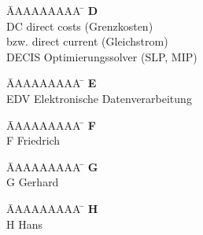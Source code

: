 \vspace*{-1.5cm}
\begin{tabbing}
	\hspace{0.0cm}  \= AAAAAAAAA \=       \hspace{2cm} \kill
	\> \textbf{D} 	\> \\
	\> DC			\> direct costs (Grenzkosten)\\
	\>      		\> bzw. direct current (Gleichstrom)\\
	\> DECIS\footnotemark \> Optimierungssolver (SLP, MIP)\\
\end{tabbing} 

\vspace*{-1.5cm}
\begin{tabbing}
	\hspace{0.0cm}  \= AAAAAAAAA \=       \hspace{2cm} \kill
	\> \textbf{E} 	\> \\
	\> EDV 			\> Elektronische Datenverarbeitung\\
\end{tabbing} 

\vspace*{-1.5cm}
\begin{tabbing}
	\hspace{0.0cm}  \= AAAAAAAAA \=       \hspace{2cm} \kill
	\>\textbf{F} 	\> \\
	\>F 			\>  Friedrich\\
\end{tabbing} 

\vspace*{-1.5cm}
\begin{tabbing}
	\hspace{0.0cm}  \= AAAAAAAAA \=       \hspace{2cm} \kill
	\>\textbf{G} 	\> \\
	\>G 			\>  Gerhard\\
\end{tabbing}

\vspace*{-1.5cm}
\begin{tabbing}
	\hspace{0.0cm}  \= AAAAAAAAA \=       \hspace{2cm} \kill
	\>\textbf{H} 	\> \\
	\>H 			\>  Hans\\
\end{tabbing} 

